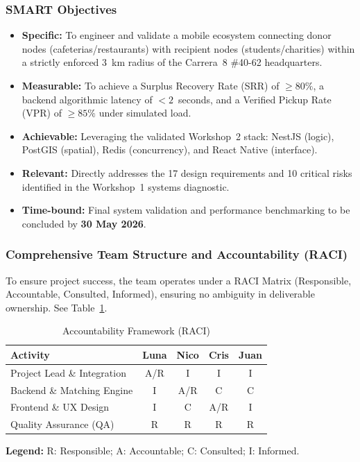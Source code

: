 \documentclass[9pt,conference]{IEEEtran}
\begin{document}
\subsubsection{SMART Objectives}
\begin{itemize}
    \item \textbf{Specific:} To engineer and validate a mobile ecosystem connecting donor nodes (cafeterias/restaurants) with recipient nodes (students/charities) within a strictly enforced 3~km radius of the Carrera~8 \#40-62 headquarters.
    \item \textbf{Measurable:} To achieve a Surplus Recovery Rate (SRR) of $\geq 80\%$, a backend algorithmic latency of $< 2$~seconds, and a Verified Pickup Rate (VPR) of $\geq 85\%$ under simulated load.
    \item \textbf{Achievable:} Leveraging the validated Workshop~2 stack: NestJS (logic), PostGIS (spatial), Redis (concurrency), and React Native (interface).
    \item \textbf{Relevant:} Directly addresses the 17 design requirements and 10 critical risks identified in the Workshop~1 systems diagnostic.
    \item \textbf{Time-bound:} Final system validation and performance benchmarking to be concluded by \textbf{30 May 2026}.
\end{itemize}

\subsubsection{Comprehensive Team Structure and Accountability (RACI)}

To ensure project success, the team operates under a RACI Matrix (Responsible, Accountable, Consulted, Informed), ensuring no ambiguity in deliverable ownership. See Table~\ref{tab:raci}.

\begin{table}[htbp]
\centering
\small
\begin{threeparttable}
    \caption{Accountability Framework (RACI)}
    \label{tab:raci}
    \begin{tabularx}{\columnwidth}{@{} X cccc @{}}
        \toprule
        \textbf{Activity} & \textbf{Luna} & \textbf{Nico} & \textbf{Cris} & \textbf{Juan} \\
        \midrule
        Project Lead \& Integration & A/R & I   & I   & I \\
        Backend \& Matching Engine  & I   & A/R & C   & C \\
        Frontend \& UX Design       & I   & C   & A/R & I \\
        Quality Assurance (QA)      & R   & R   & R   & R \\
        \bottomrule
    \end{tabularx}
    \begin{tablenotes}
        \small
        \item \textbf{Legend:} R: Responsible; A: Accountable; C: Consulted; I: Informed.
    \end{tablenotes}
\end{threeparttable}
\end{table}
\end{document}
